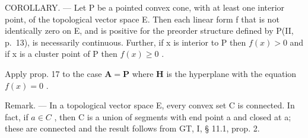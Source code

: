 COROLLARY. --- Let P be a pointed convex cone, with at least one interior point, of the topological vector space E. Then each linear form f that is not identically zero on E, and is positive for the preorder structure defined by P(II, p.~13), is necessarily continuous. Further, if x is interior to P then \(f(x) > 0\) and if x is a cluster point of P then \(f(x) \geqslant 0\) .

Apply prop. 17 to the case \(\mathbf{A} = \mathbf{P}\) where \(\mathbf{H}\) is the hyperplane with the equation \(f(x) = 0\) .

Remark. --- In a topological vector space E, every convex set C is connected. In fact, if \(a \in C\) , then C is a union of segments with end point a and closed at a; these are connected and the result follows from GT, I, § 11.1, prop. 2.

